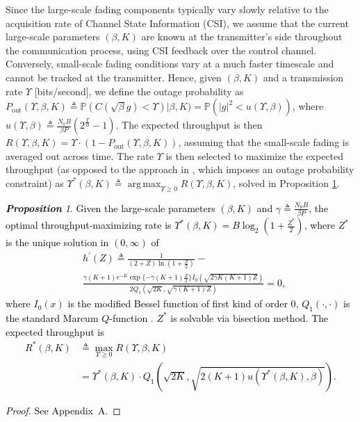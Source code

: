 \documentclass[10pt, twocolumn]{IEEEtran}
\theoremstyle{plain}
\theoremstyle{definition}
\theoremstyle{remark}
\newtheorem{prop}{\textbf{Proposition}}
\DeclareMathOperator*{\argmax}{arg\,max}
\newcommand\hlt[1]{\textcolor{black}{#1}}
\begin{document}
Since the large-scale fading components typically vary slowly relative to the acquisition rate of Channel State Information (CSI), we assume that the current large-scale parameters $(\beta,K)$ are known at the transmitter's side throughout the communication process, using CSI feedback over the control channel. Conversely, small-scale fading conditions vary at a much faster timescale and cannot be tracked at the transmitter. 
Hence, given $(\beta,K)$ and a transmission rate $\Upsilon$ [bits/second], we define the outage probability as $P_{\mathrm{out}}(\Upsilon,\beta,K){\triangleq}\mathbb{P}(C(\sqrt{\beta}g){<}\Upsilon)|\beta,K){=}\mathbb{P}\left(|g|^{2}{<}u(\Upsilon,\beta)\right)$, where $u(\Upsilon,\beta){\triangleq}\frac{N_{0}B}{\beta P}(2^{\frac{\Upsilon}{B}}{-}1)$. The expected throughput is then $R(\Upsilon,\beta,K){=}\Upsilon{\cdot}\left(1{-}P_{\mathrm{out}}(\Upsilon,\beta,K)\right)$, assuming that the small-scale fading is averaged out across time. The rate $\Upsilon$ is then selected to maximize the expected throughput (as opposed to the approach in \cite{Rician}, which imposes an outage probability constraint) as $\Upsilon^{*}(\beta,K){\triangleq}\argmax_{\Upsilon{\geq}0}R(\Upsilon,\beta,K)$, solved in Proposition \ref{P1}.
\hlt{\begin{prop}\label{P1}
    Given the large-scale parameters $(\beta,K)$ and $\gamma{\triangleq}\frac{N_{0}B}{\beta P}$, the optimal throughput-maximizing rate is $\Upsilon^{*}(\beta,K){=}B\log_{2}\left(1{+}\frac{Z^*}{2}\right)$, where $Z^*$ is the unique solution in $(0,\infty)$ of
    \begin{align}\label{hprime}
        &h^\prime(Z) \triangleq \frac{1}{(2{+}Z)\ln\left(1{+}\frac{Z}{2}\right)} - \\&\frac{\gamma(K{+}1)e^{-K}\exp\{-\gamma(K+1)\frac{Z}{2}\}I_{0}(\sqrt{2\gamma K(K{+}1)Z})}{2Q_{1}(\sqrt{2K},\sqrt{\gamma(K{+}1)Z})}{=}0,
    \end{align}
    where $I_{0}(x)$ is the modified Bessel function of first kind of order $0$, $Q_{1}(\cdot,\cdot)$ is the standard Marcum $Q$-function \cite{Rician}. $Z^*$ is solvable via bisection method. The expected throughput is
    \begin{align}
    	R^*(\beta,K) &\triangleq \max_{\Upsilon \geq 0} R(\Upsilon, \beta, K)\\&= \Upsilon^{*}(\beta,K){\cdot}Q_{1}(\sqrt{2K},\sqrt{2(K{+}1)u(\Upsilon^{*}(\beta,K),\beta)}).
    \end{align}
\end{prop}
\begin{proof}
    See Appendix~A.
\end{proof}}
\end{document}
